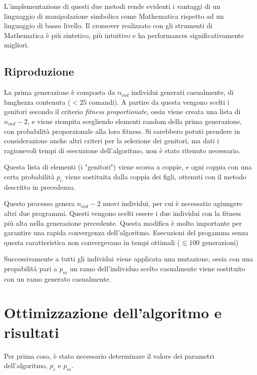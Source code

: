 \documentclass[paper=a4, fontsize=11pt]{scrartcl}
\numberwithin{equation}{section}		%
\numberwithin{figure}{section}			%
\numberwithin{table}{section}				%
\begin{document}
L'implementazione di questi due metodi rende evidenti i vantaggi di un linguaggio di manipolazione simbolica come Mathematica rispetto ad un linguaggio di basso livello. Il crossover realizzato con gli strumenti di Mathematica è più sintetico, più intuitivo e ha performances significativamente migliori.



\subsection{Riproduzione}

La prima generazione è composta da $n_{ind}$ individui generati casualmente, di lunghezza contenuta ($<25$ comandi). A partire da questa vengono scelti i genitori secondo il criterio \emph{fitness proportionate}, ossia viene creata una lista di $n_{ind} -2$, e viene riempita scegliendo elementi random della prima generazione, con probabilità proporzionale  alla loro fitness. 
Si sarebbero potuti prendere in considerazione anche altri criteri per la selezione dei genitori, ma dati i ragionevoli tempi di esecuzione dell'algoritmo, non è stato ritenuto necessario.

Questa lista di elementi (i "genitori") viene scorsa a coppie, e ogni coppia con una certa probabilità $p_c$  viene sostituita dalla coppia dei figli, ottenuti con il metodo descritto in precedenza. 

Questo processo genera $n_{ind}-2$ nuovi individui, per cui è necessatio agiungere altri due programmi. Questi vengono scelti essere i due individui con la fitness più alta nella generazione precedente.  Questa  modifica è molto importante per garantire una rapida convergenza dell'algoritmo. Esecuzioni del progamma senza questa caratteristica non convergevano in tempi ottimali ($\lesssim 100$ generazioni)

Successivamente a tutti gli individui viene applicata una mutazione, ossia con una propabilità pari a $p_m$ un ramo dell'individuo scelto casualmente viene sostituito con un ramo generato casualmente.



\section{Ottimizzazione dell'algoritmo e risultati}



Per prima cosa, è stato necessario determinare il valore dei parametri dell'algoritmo, $p_c$ e $p_m$.
\end{document}
